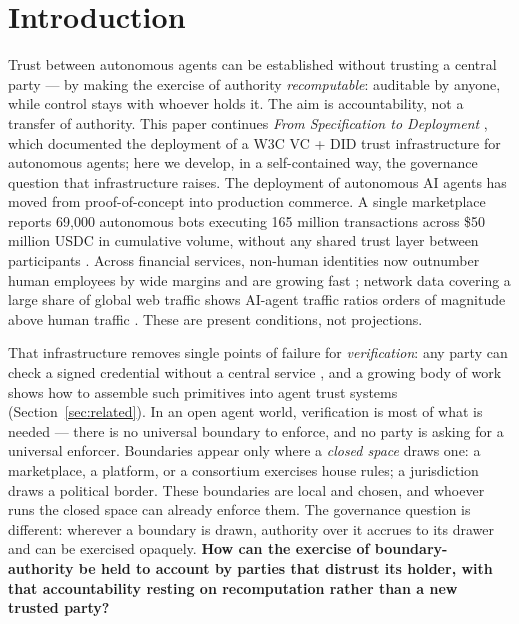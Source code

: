 \section{Introduction}
\label{sec:intro}

Trust between autonomous agents can be established without trusting a central party — by making the exercise of authority \emph{recomputable}: auditable by anyone, while control stays with whoever holds it. The aim is accountability, not a transfer of authority. This paper continues \emph{From Specification to Deployment} \cite{ref57_kroehl_v19}, which documented the deployment of a W3C VC + DID trust infrastructure for autonomous agents; here we develop, in a self-contained way, the governance question that infrastructure raises. The deployment of autonomous AI agents has moved from proof-of-concept into production commerce. A single marketplace reports 69{,}000 autonomous bots executing 165 million transactions across \$50 million USDC in cumulative volume, without any shared trust layer between participants \cite{ref1_agentmarket}. Across financial services, non-human identities now outnumber human employees by wide margins and are growing fast \cite{ref2_neville,ref3_entrolabs}; network data covering a large share of global web traffic shows AI-agent traffic ratios orders of magnitude above human traffic \cite{ref4_prince,ref5_cloudflare}. These are present conditions, not projections.

That infrastructure removes single points of failure for \emph{verification}: any party can check a signed credential without a central service \cite{ref6_w3cdid,ref7_w3cvc}, and a growing body of work shows how to assemble such primitives into agent trust systems (Section~\ref{sec:related}). In an open agent world, verification is most of what is needed — there is no universal boundary to enforce, and no party is asking for a universal enforcer. Boundaries appear only where a \emph{closed space} draws one: a marketplace, a platform, or a consortium exercises house rules; a jurisdiction draws a political border. These boundaries are local and chosen, and whoever runs the closed space can already enforce them. The governance question is different: wherever a boundary is drawn, authority over it accrues to its drawer and can be exercised opaquely. \textbf{How can the exercise of boundary-authority be held to account by parties that distrust its holder, with that accountability resting on recomputation rather than a new trusted party?}

